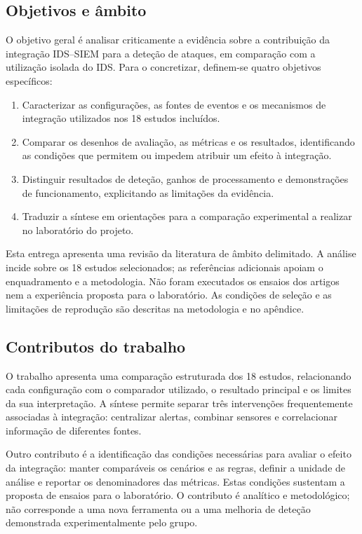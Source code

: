 \documentclass[11pt,a4paper]{article}
\begin{document}
\subsection{Objetivos e âmbito}
O objetivo geral é analisar criticamente a evidência sobre a contribuição da integração IDS--SIEM para a deteção de ataques, em comparação com a utilização isolada do IDS. Para o concretizar, definem-se quatro objetivos específicos:
\begin{enumerate}
\item Caracterizar as configurações, as fontes de eventos e os mecanismos de integração utilizados nos 18 estudos incluídos.
\item Comparar os desenhos de avaliação, as métricas e os resultados, identificando as condições que permitem ou impedem atribuir um efeito à integração.
\item Distinguir resultados de deteção, ganhos de processamento e demonstrações de funcionamento, explicitando as limitações da evidência.
\item Traduzir a síntese em orientações para a comparação experimental a realizar no laboratório do projeto.
\end{enumerate}

Esta entrega apresenta uma revisão da literatura de âmbito delimitado. A análise incide sobre os 18 estudos selecionados; as referências adicionais apoiam o enquadramento e a metodologia. Não foram executados os ensaios dos artigos nem a experiência proposta para o laboratório. As condições de seleção e as limitações de reprodução são descritas na metodologia e no apêndice.

\subsection{Contributos do trabalho}
O trabalho apresenta uma comparação estruturada dos 18 estudos, relacionando cada configuração com o comparador utilizado, o resultado principal e os limites da sua interpretação. A síntese permite separar três intervenções frequentemente associadas à integração: centralizar alertas, combinar sensores e correlacionar informação de diferentes fontes.

Outro contributo é a identificação das condições necessárias para avaliar o efeito da integração: manter comparáveis os cenários e as regras, definir a unidade de análise e reportar os denominadores das métricas. Estas condições sustentam a proposta de ensaios para o laboratório. O contributo é analítico e metodológico; não corresponde a uma nova ferramenta ou a uma melhoria de deteção demonstrada experimentalmente pelo grupo.
\end{document}
